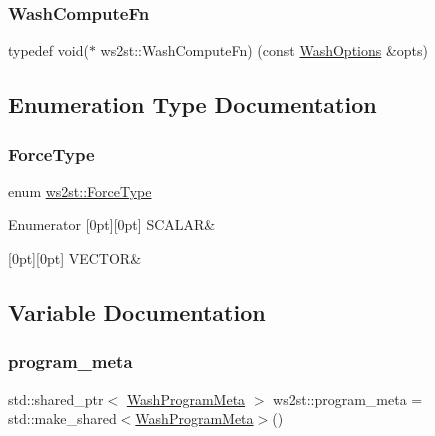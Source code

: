 \subsubsection{\texorpdfstring{Wash\+Compute\+Fn}{WashComputeFn}}
{\footnotesize\ttfamily typedef void($\ast$  ws2st\+::\+Wash\+Compute\+Fn) (const \mbox{\hyperlink{structWashOptions}{Wash\+Options}} \&opts)}



\subsection{Enumeration Type Documentation}
\mbox{\label{namespacews2st_a6f0a66f31a77eae4630693b8d4d27a05}} 
\subsubsection{\texorpdfstring{Force\+Type}{ForceType}}
{\footnotesize\ttfamily enum \mbox{\hyperlink{namespacews2st_a6f0a66f31a77eae4630693b8d4d27a05}{ws2st\+::\+Force\+Type}}\hspace{0.3cm}{\ttfamily [strong]}}

\begin{DoxyEnumFields}{Enumerator}
[0pt][0pt]{}\mbox{\label{namespacews2st_a6f0a66f31a77eae4630693b8d4d27a05a8f3d9a4b6a7b7f2c7afa61ca113d0db9}} 
S\+C\+A\+L\+AR&\\
\hline

[0pt][0pt]{}\mbox{\label{namespacews2st_a6f0a66f31a77eae4630693b8d4d27a05a87752381b583740610f1dfeb07fdad7e}} 
V\+E\+C\+T\+OR&\\
\hline

\end{DoxyEnumFields}


\subsection{Variable Documentation}
\mbox{\label{namespacews2st_ab3effe8d87dc3f3df0533a3cdcf136e4}} 
\subsubsection{\texorpdfstring{program\+\_\+meta}{program\_meta}}
{\footnotesize\ttfamily std\+::shared\+\_\+ptr$<$ \mbox{\hyperlink{structws2st_1_1WashProgramMeta}{Wash\+Program\+Meta}} $>$ ws2st\+::program\+\_\+meta = std\+::make\+\_\+shared$<$\mbox{\hyperlink{structws2st_1_1WashProgramMeta}{Wash\+Program\+Meta}}$>$()}

